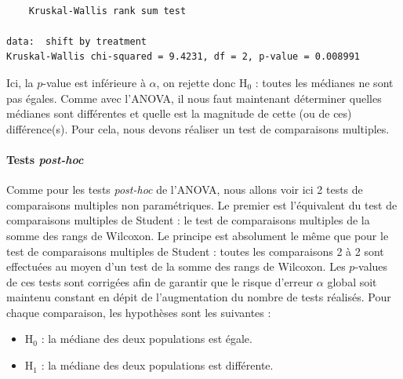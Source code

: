 \documentclass[
  a4paper,
]{article}
\newenvironment{Shaded}{\begin{snugshade}}{\end{snugshade}}
\newcommand{\CommentTok}[1]{\textcolor[rgb]{0.54,0.53,0.53}{#1}}
\newcommand{\KeywordTok}[1]{\textcolor[rgb]{0.12,0.11,0.11}{\textbf{#1}}}
\newcommand{\NormalTok}[1]{\textcolor[rgb]{0.12,0.11,0.11}{#1}}
\newcommand{\OperatorTok}[1]{\textcolor[rgb]{0.12,0.11,0.11}{#1}}
\newcommand{\StringTok}[1]{\textcolor[rgb]{0.75,0.01,0.01}{#1}}
\providecommand{\tightlist}{%
  \setlength{\itemsep}{0pt}\setlength{\parskip}{0pt}}
\begin{document}
\begin{verbatim}

    Kruskal-Wallis rank sum test

data:  shift by treatment
Kruskal-Wallis chi-squared = 9.4231, df = 2, p-value = 0.008991
\end{verbatim}

Ici, la \(p\)-value est inférieure à \(\alpha\), on rejette donc H\(_0\) : toutes les médianes ne sont pas égales. Comme avec l'ANOVA, il nous faut maintenant déterminer quelles médianes sont différentes et quelle est la magnitude de cette (ou de ces) différence(s). Pour cela, nous devons réaliser un test de comparaisons multiples.

\hypertarget{tests-post-hoc-1}{%
\paragraph{\texorpdfstring{Tests \emph{post-hoc}}{Tests post-hoc}}\label{tests-post-hoc-1}}

Comme pour les tests \emph{post-hoc} de l'ANOVA, nous allons voir ici 2 tests de comparaisons multiples non paramétriques. Le premier est l'équivalent du test de comparaisons multiples de Student : le test de comparaisons multiples de la somme des rangs de Wilcoxon. Le principe est absolument le même que pour le test de comparaisons multiples de Student : toutes les comparaisons 2 à 2 sont effectuées au moyen d'un test de la somme des rangs de Wilcoxon. Les \(p\)-values de ces tests sont corrigées afin de garantir que le risque d'erreur \(\alpha\) global soit maintenu constant en dépit de l'augmentation du nombre de tests réalisés. Pour chaque comparaison, les hypothèses sont les suivantes :

\begin{itemize}
\tightlist
\item
  H\(_0\) : la médiane des deux populations est égale.
\item
  H\(_1\) : la médiane des deux populations est différente.
\end{itemize}

\begin{Shaded}
\end{Shaded}
\end{document}
